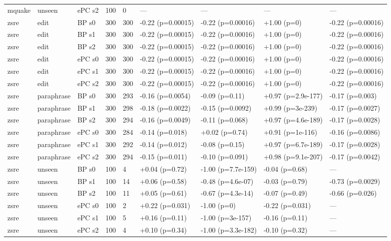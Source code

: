 \documentclass[10pt,a4paper]{article}
\begin{document}
\begin{center}
\begin{tabularx}{\textwidth}{@{}p{}XXXXXXXX@{}}
mquake & unseen & ePC s2 & 100 & 0 & — & — & — & — \\
zsre & edit & BP s0 & 300 & 300 & -0.22 (p=0.00015) & -0.22 (p=0.00016) & +1.00 (p=0) & -0.22 (p=0.00016) \\
zsre & edit & BP s1 & 300 & 300 & -0.22 (p=0.00015) & -0.22 (p=0.00016) & +1.00 (p=0) & -0.22 (p=0.00016) \\
zsre & edit & BP s2 & 300 & 300 & -0.22 (p=0.00015) & -0.22 (p=0.00016) & +1.00 (p=0) & -0.22 (p=0.00016) \\
zsre & edit & ePC s0 & 300 & 300 & -0.22 (p=0.00015) & -0.22 (p=0.00016) & +1.00 (p=0) & -0.22 (p=0.00016) \\
zsre & edit & ePC s1 & 300 & 300 & -0.22 (p=0.00015) & -0.22 (p=0.00016) & +1.00 (p=0) & -0.22 (p=0.00016) \\
zsre & edit & ePC s2 & 300 & 300 & -0.22 (p=0.00015) & -0.22 (p=0.00016) & +1.00 (p=0) & -0.22 (p=0.00016) \\
zsre & paraphrase & BP s0 & 300 & 293 & -0.16 (p=0.0054) & -0.09 (p=0.11) & +0.97 (p=2.9e-177) & -0.17 (p=0.003) \\
zsre & paraphrase & BP s1 & 300 & 298 & -0.18 (p=0.0022) & -0.15 (p=0.0092) & +0.99 (p=3e-239) & -0.17 (p=0.0027) \\
zsre & paraphrase & BP s2 & 300 & 294 & -0.16 (p=0.0049) & -0.11 (p=0.068) & +0.97 (p=4.6e-189) & -0.17 (p=0.0028) \\
zsre & paraphrase & ePC s0 & 300 & 284 & -0.14 (p=0.018) & +0.02 (p=0.74) & +0.91 (p=1e-116) & -0.16 (p=0.0086) \\
zsre & paraphrase & ePC s1 & 300 & 292 & -0.14 (p=0.012) & -0.08 (p=0.15) & +0.97 (p=6.7e-189) & -0.17 (p=0.0028) \\
zsre & paraphrase & ePC s2 & 300 & 294 & -0.15 (p=0.011) & -0.10 (p=0.091) & +0.98 (p=9.1e-207) & -0.17 (p=0.0042) \\
zsre & unseen & BP s0 & 100 & 4 & +0.04 (p=0.72) & -1.00 (p=7.7e-159) & -0.04 (p=0.68) & — \\
zsre & unseen & BP s1 & 100 & 14 & +0.06 (p=0.58) & -0.48 (p=4.6e-07) & -0.03 (p=0.79) & -0.73 (p=0.0029) \\
zsre & unseen & BP s2 & 100 & 11 & +0.05 (p=0.61) & -0.67 (p=4.3e-14) & -0.07 (p=0.49) & -0.66 (p=0.026) \\
zsre & unseen & ePC s0 & 100 & 2 & +0.22 (p=0.031) & -1.00 (p=0) & -0.22 (p=0.031) & — \\
zsre & unseen & ePC s1 & 100 & 5 & +0.16 (p=0.11) & -1.00 (p=3e-157) & -0.16 (p=0.11) & — \\
zsre & unseen & ePC s2 & 100 & 4 & +0.10 (p=0.34) & -1.00 (p=3.3e-182) & -0.10 (p=0.32) & — \\
\bottomrule
\end{tabularx}
\end{center}
\end{document}

